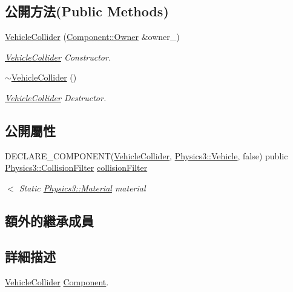 \subsection*{公開方法(Public Methods)}
\begin{DoxyCompactItemize}
\item 
\hyperlink{class_magnum_1_1_vehicle_collider_a8d7f5cedccf818b6b2930daf62e77a9a}{Vehicle\+Collider} (\hyperlink{class_magnum_1_1_component_1_1_owner}{Component\+::\+Owner} \&owner\+\_\+)
\begin{DoxyCompactList}\small\item\em \hyperlink{class_magnum_1_1_vehicle_collider}{Vehicle\+Collider} Constructor. \end{DoxyCompactList}\item 
\hyperlink{class_magnum_1_1_vehicle_collider_a77ca7dc0653dd6bb43d91ad01ce6b8ea}{$\sim$\+Vehicle\+Collider} ()
\begin{DoxyCompactList}\small\item\em \hyperlink{class_magnum_1_1_vehicle_collider}{Vehicle\+Collider} Destructor. \end{DoxyCompactList}\end{DoxyCompactItemize}
\subsection*{公開屬性}
\begin{DoxyCompactItemize}
\item 
D\+E\+C\+L\+A\+R\+E\+\_\+\+C\+O\+M\+P\+O\+N\+E\+NT(\hyperlink{class_magnum_1_1_vehicle_collider}{Vehicle\+Collider}, \hyperlink{class_magnum_1_1_physics3_1_1_vehicle}{Physics3\+::\+Vehicle}, false) public \hyperlink{class_magnum_1_1_physics3_1_1_collision_filter}{Physics3\+::\+Collision\+Filter} \hyperlink{class_magnum_1_1_vehicle_collider_a445376e710c29b1d15ad15f907e23fd3}{collision\+Filter}
\begin{DoxyCompactList}\small\item\em $<$ Static \hyperlink{class_magnum_1_1_physics3_1_1_material}{Physics3\+::\+Material} material \end{DoxyCompactList}\end{DoxyCompactItemize}
\subsection*{額外的繼承成員}


\subsection{詳細描述}
\hyperlink{class_magnum_1_1_vehicle_collider}{Vehicle\+Collider} \hyperlink{class_magnum_1_1_component}{Component}. 

